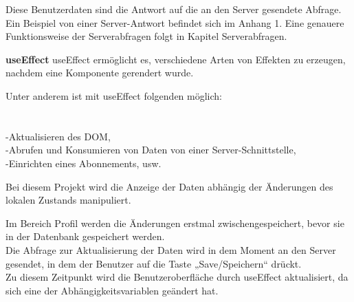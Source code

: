 Diese Benutzerdaten sind die Antwort auf die an den Server gesendete Abfrage.
Ein Beispiel von einer Server-Antwort befindet sich im Anhang 1.
Eine genauere Funktionsweise der Serverabfragen folgt in Kapitel Serverabfragen.
\\

\newpage

\textbf{useEffect}
useEffect ermöglicht es, verschiedene Arten von Effekten zu erzeugen, nachdem eine Komponente gerendert wurde.

Unter anderem ist mit useEffect folgenden möglich:\\\\
\\-Aktualisieren des DOM,
\\-Abrufen und Konsumieren von Daten von einer Server-Schnittstelle,
\\-Einrichten eines Abonnements, usw.
\\
\begin{flushleft}

  Bei diesem Projekt wird die Anzeige der Daten abhängig der Änderungen des lokalen Zustands manipuliert.
\end{flushleft}

Im Bereich Profil werden die Änderungen erstmal zwischengespeichert, bevor sie in der Datenbank gespeichert werden. 
\\
Die Abfrage zur Aktualisierung der Daten wird in dem Moment an den Server gesendet, in dem der Benutzer auf die Taste „Save/Speichern“ drückt.
\\
Zu diesem Zeitpunkt wird die Benutzeroberfläche durch useEffect aktualisiert, da sich eine der Abhängigkeitsvariablen geändert hat.
\\

